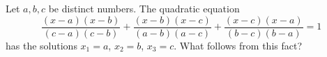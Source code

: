 Let $a, b, c$ be distinct numbers. The quadratic equation
\[ \frac{(x - a)(x - b)}{(c - a)(c - b)} + \frac{(x - b)(x - c)}{(a - b)(a - c)} + \frac{(x - c)(x - a)}{(b - c)(b - a)} = 1 \]
has the solutions $x_1 = a$, $x_2 = b$, $x_3 = c$. What follows from this fact?

